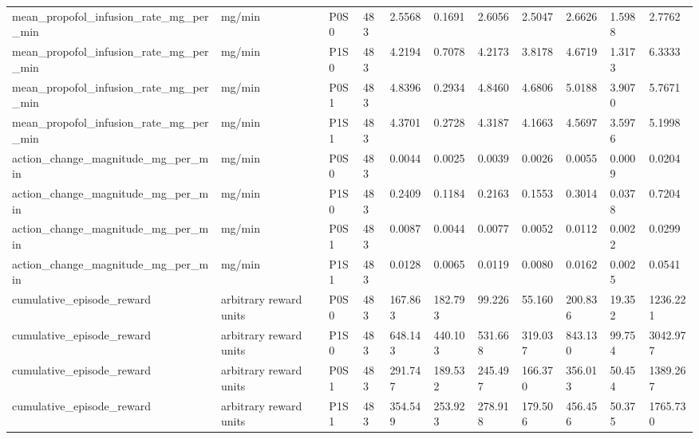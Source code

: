 \begin{tabular}{lllllllllll}
mean\_propofol\_infusion\_rate\_mg\_per\_min & mg/min & P0S0 & 483 & 2.5568 & 0.1691 & 2.6056 & 2.5047 & 2.6626 & 1.5988 & 2.7762 \\
mean\_propofol\_infusion\_rate\_mg\_per\_min & mg/min & P1S0 & 483 & 4.2194 & 0.7078 & 4.2173 & 3.8178 & 4.6719 & 1.3173 & 6.3333 \\
mean\_propofol\_infusion\_rate\_mg\_per\_min & mg/min & P0S1 & 483 & 4.8396 & 0.2934 & 4.8460 & 4.6806 & 5.0188 & 3.9070 & 5.7671 \\
mean\_propofol\_infusion\_rate\_mg\_per\_min & mg/min & P1S1 & 483 & 4.3701 & 0.2728 & 4.3187 & 4.1663 & 4.5697 & 3.5976 & 5.1998 \\
action\_change\_magnitude\_mg\_per\_min & mg/min & P0S0 & 483 & 0.0044 & 0.0025 & 0.0039 & 0.0026 & 0.0055 & 0.0009 & 0.0204 \\
action\_change\_magnitude\_mg\_per\_min & mg/min & P1S0 & 483 & 0.2409 & 0.1184 & 0.2163 & 0.1553 & 0.3014 & 0.0378 & 0.7204 \\
action\_change\_magnitude\_mg\_per\_min & mg/min & P0S1 & 483 & 0.0087 & 0.0044 & 0.0077 & 0.0052 & 0.0112 & 0.0022 & 0.0299 \\
action\_change\_magnitude\_mg\_per\_min & mg/min & P1S1 & 483 & 0.0128 & 0.0065 & 0.0119 & 0.0080 & 0.0162 & 0.0025 & 0.0541 \\
cumulative\_episode\_reward & arbitrary reward units & P0S0 & 483 & 167.863 & 182.793 & 99.226 & 55.160 & 200.836 & 19.352 & 1236.221 \\
cumulative\_episode\_reward & arbitrary reward units & P1S0 & 483 & 648.143 & 440.103 & 531.668 & 319.037 & 843.130 & 99.754 & 3042.977 \\
cumulative\_episode\_reward & arbitrary reward units & P0S1 & 483 & 291.747 & 189.532 & 245.497 & 166.370 & 356.013 & 50.454 & 1389.267 \\
cumulative\_episode\_reward & arbitrary reward units & P1S1 & 483 & 354.549 & 253.923 & 278.918 & 179.506 & 456.456 & 50.375 & 1765.730 \\
\hline
\end{tabular}
